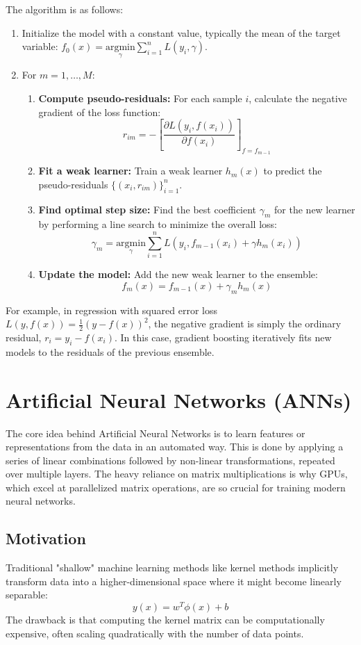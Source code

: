\documentclass{article}
\begin{document}
\begin{multicols}{2}
The algorithm is as follows:
\begin{enumerate}
    \item Initialize the model with a constant value, typically the mean of the target variable: $f_0(x) = \underset{\gamma}{\text{argmin}} \sum_{i=1}^n L(y_i, \gamma)$.
    \item For $m = 1, \dots, M$:
    \begin{enumerate}
        \item \textbf{Compute pseudo-residuals:} For each sample $i$, calculate the negative gradient of the loss function:
        $$ r_{im} = -\left[\frac{\partial L(y_i, f(x_i))}{\partial f(x_i)}\right]_{f=f_{m-1}} $$
        \item \textbf{Fit a weak learner:} Train a weak learner $h_m(x)$ to predict the pseudo-residuals $\{ (x_i, r_{im}) \}_{i=1}^n$.
        \item \textbf{Find optimal step size:} Find the best coefficient $\gamma_m$ for the new learner by performing a line search to minimize the overall loss:
        $$ \gamma_m = \underset{\gamma}{\text{argmin}} \sum_{i=1}^{n} L(y_i, f_{m-1}(x_i) + \gamma h_m(x_i)) $$
        \item \textbf{Update the model:} Add the new weak learner to the ensemble:
        $$ f_m(x) = f_{m-1}(x) + \gamma_m h_m(x) $$
    \end{enumerate}
\end{enumerate}
For example, in regression with squared error loss $L(y, f(x)) = \frac{1}{2}(y-f(x))^2$, the negative gradient is simply the ordinary residual, $r_i = y_i - f(x_i)$. In this case, gradient boosting iteratively fits new models to the residuals of the previous ensemble.

\section{Artificial Neural Networks (ANNs)}
The core idea behind Artificial Neural Networks is to learn features or representations from the data in an automated way. This is done by applying a series of linear combinations followed by non-linear transformations, repeated over multiple layers. The heavy reliance on matrix multiplications is why GPUs, which excel at parallelized matrix operations, are so crucial for training modern neural networks.

\subsection{Motivation}
Traditional "shallow" machine learning methods like kernel methods implicitly transform data into a higher-dimensional space where it might become linearly separable:
$$ y(x) = w^T \phi(x) + b $$
The drawback is that computing the kernel matrix can be computationally expensive, often scaling quadratically with the number of data points.


\end{multicols}
\end{document}
